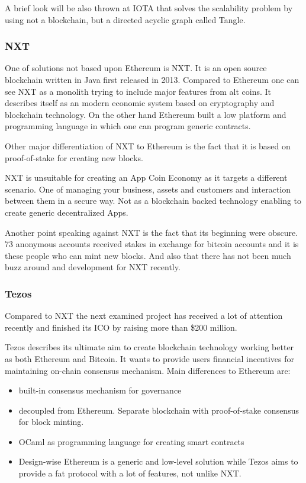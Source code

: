 A brief look will be also thrown at IOTA that solves the scalability problem by using not a blockchain, but a directed acyclic graph called Tangle.

\subsubsection{NXT}
One of solutions not based upon Ethereum is NXT. It is an open source blockchain written in Java first released in 2013. Compared to Ethereum one can see NXT as a monolith trying to include major features from alt coins. It describes itself as an modern economic system based on cryptography and blockchain technology. On the other hand Ethereum built a low platform and programming language in which one can program generic contracts.

Other major differentiation of NXT to Ethereum is the fact that it is based on proof-of-stake for creating new blocks.

NXT is unsuitable for creating an App Coin Economy as it targets a different scenario. One of managing your business, assets and customers and interaction between them in a secure way. Not as a blockchain backed technology enabling to create generic decentralized Apps.

Another point speaking against NXT is the fact that its beginning were obscure. 73 anonymous accounts received stakes in exchange for bitcoin accounts and it is these people who can mint new blocks. And also that there has not been much buzz around and development for NXT recently.

\subsubsection{Tezos}
Compared to NXT the next examined project has received a lot of attention recently and finished its ICO by raising more than \$200 million.

Tezos describes its ultimate aim to create blockchain technology working better as both Ethereum and Bitcoin. It wants to provide users financial incentives for maintaining on-chain consensus mechanism. Main differences to Ethereum are:

\begin{itemize}
    \item built-in consensus mechanism for governance
    \item decoupled from Ethereum. Separate blockchain with proof-of-stake consensus for block minting.
    \item OCaml as programming language for creating smart contracts
    \item Design-wise Ethereum is a generic and low-level solution while Tezos aims to provide a fat protocol with a lot of features, not unlike NXT.
\end{itemize}

